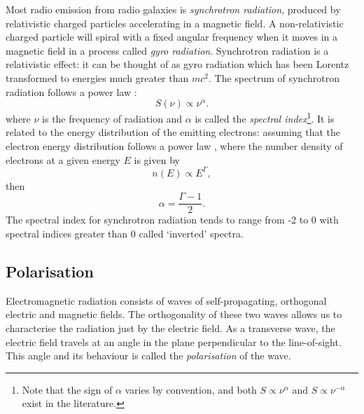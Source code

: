 \documentclass[11pt, a4paper]{book}
\newcommand{\defn}[1]{\emph{#1}}
\providecommand{\DIFaddtex}[1]{{\protect\color{blue}\uwave{#1}}} %
\providecommand{\DIFaddbegin}{} %
\providecommand{\DIFaddend}{} %
\providecommand{\DIFadd}[1]{\texorpdfstring{\DIFaddtex{#1}}{#1}} %
\newcommand{\DIFaddincludegraphics}[2][]{{\color{blue}\fbox{\DIFOincludegraphics[#1]{#2}}}} %
\DeclareRobustCommand{\DIFaddbegin}{\DIFOaddbegin \let\includegraphics\DIFaddincludegraphics} %
\DeclareRobustCommand{\DIFaddend}{\DIFOaddend \let\includegraphics\DIFOincludegraphics} %
\begin{document}
        Most radio emission from radio galaxies is \defn{synchrotron radiation}, produced by relativistic charged particles accelerating in a magnetic field. A non-relativistic charged particle will spiral with a fixed angular frequency when it moves in a magnetic field in a process called \defn{gyro radiation}. Synchrotron radiation is a relativistic effect: it can be thought of as gyro radiation which has been Lorentz transformed to energies much greater than $mc^2$. The spectrum of \DIFaddbegin \DIFadd{optically thin }\DIFaddend synchrotron radiation follows a power law \citep{condon_essential_2016}:
        \begin{equation}
            \label{eq:spectral-index}
            S(\nu) \propto \nu^{\alpha}.
        \end{equation}
        where $\nu$ is the frequency of radiation and $\alpha$ is called the \defn{spectral index}\footnote{Note that the sign of $\alpha$ varies by convention, and both $S \propto \nu^{\alpha}$ and $S \propto \nu^{-\alpha}$ exist in the literature.}. It is related to the energy distribution of the emitting electrons: assuming that the electron energy distribution follows a power law \citep[which it generally does,][]{rybicki_radiative_2008}, where the number density of electrons at a given energy $E$ is given by
        \begin{equation}
            n(E) \propto E^\Gamma,
        \end{equation}
        then
        \begin{equation}
            \alpha = \frac{\Gamma - 1}{2}.
        \end{equation}
        The spectral index for synchrotron radiation tends to range from -2 to 0 \citep{condon_essential_2016} with spectral indices greater than 0 called `inverted' spectra.

    \subsection{Polarisation}
    \label{sec:polarisation}

        Electromagnetic radiation consists of waves of self-propagating, orthogonal electric and magnetic fields. The orthogonality of these two waves allows us to characterise the radiation just by the electric field. As a transverse wave, the electric field travels at an angle in the plane perpendicular to the line-of-sight. This angle and its behaviour is called the \defn{polarisation} of the wave.
\end{document}
